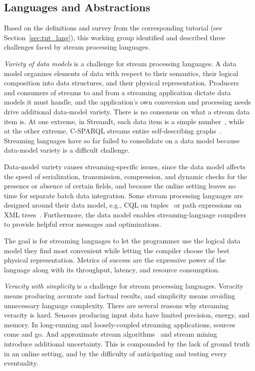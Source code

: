 \subsection{Languages and Abstractions}\label{sec:wg_lang}

Based on the definitions and survey from the corresponding tutorial
(see Section~\ref{sec:tut_lang}), this working group identified and
described three challenges faced by stream processing languages.

\emph{Variety of data models} is a challenge for stream processing
languages. A data model organizes elements of data with respect to
their semantics, their logical composition into data structures, and
their physical representation. Producers and consumers of streams to
and from a streaming application dictate data models it must handle,
and the application's own conversion and processing needs drive
additional data-model variety.  There is no consensus on what a stream
data item is. At one extreme, in StreamIt, each data item is a simple
number~\cite{thies_et_al_2002}, while at the other extreme, C-SPARQL
streams entire self-describing graphs~\cite{barbieri_et_al_2009}.
Streaming languages have so far failed to consolidate on a data model
because data-model variety is a difficult challenge.

Data-model variety causes streaming-specific issues, since the data
model affects the speed of serialization, transmission, compression,
and dynamic checks for the presence or absence of certain fields, and
because the online setting leaves no time for separate batch data
integration. Some stream processing languages are designed around
their data model, e.g., CQL on tuples~\cite{arasu_babu_widom_2006} or
path expressions on XML trees~\cite{diao_et_al_2002}. Furthermore, the
data model enables streaming-language compilers to provide helpful
error messages and optimizations.

The goal is for streaming languages to let the programmer use the
logical data model they find most convenient while letting the
compiler choose the best physical representation. Metrics of success
are the expressive power of the language along with its throughput,
latency, and resource consumption.

\emph{Veracity with simplicity} is a challenge for stream processing
languages. Veracity means producing accurate and factual results, and
simplicity means avoiding unnecessary language complexity. There are
several reasons why streaming veracity is hard. Sensors producing
input data have limited precision, energy, and memory. In
long-running and loosely-coupled streaming applications,
sources come and go. And approximate stream
algorithms~\cite{babcock_et_al_2002} and stream
mining~\cite{gaber_zaslavsky_krishnaswamy_2005} introduce additional
uncertainty. This is compounded by the lack of ground truth in an
online setting, and by the difficulty of anticipating and testing
every eventuality.

